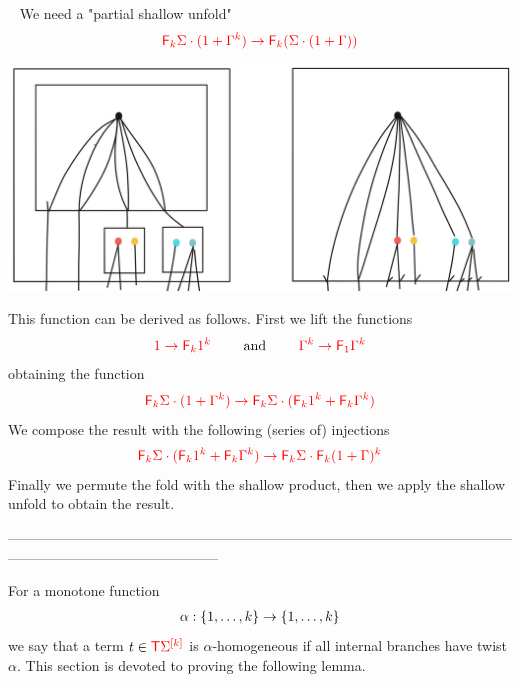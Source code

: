 \begin{example}~\label{ex:PartialShallowUnfold}
We need a "partial shallow unfold"
\begin{align*}
{\color{red}{{\color{red}{\mathsf F_{k}}}\Sigma\cdot (1+\Gamma^k)\to {\color{red}{\mathsf F_{k}}}(\Sigma\cdot(1+\Gamma))}}
\end{align*}
\begin{center}
\includegraphics[scale=.09]{MyPicPartialShallowUnfold.jpg}
\end{center}
This function can be derived as follows. First we lift the functions
\begin{align*}
{\color{red}{1\to {\color{red}{\mathsf F_{k}}}1^k}}\qquad \text{ and } \qquad{\color{red}{\Gamma^k\to {\color{red}{\mathsf F_{1}}}\Gamma^k}}
\end{align*}
obtaining the function
\begin{align*}
{\color{red}{{\color{red}{\mathsf F_{k}}}\Sigma\cdot (1+\Gamma^k)\to {\color{red}{\mathsf F_{k}}}\Sigma\cdot ({\color{red}{\mathsf F_{k}}}1^k+{\color{red}{\mathsf F_{k}}}\Gamma^k) }}
\end{align*}
We compose the result with the following  (series of) injections
\begin{align*}
{\color{red}{{\color{red}{\mathsf F_{k}}}\Sigma\cdot ({\color{red}{\mathsf F_{k}}}1^k+{\color{red}{\mathsf F_{k}}}\Gamma^k)\to {\color{red}{\mathsf F_{k}}}\Sigma\cdot {\color{red}{\mathsf F_{k}}}(1+\Gamma)^k}}
\end{align*}
Finally we permute the fold with the shallow product, then we apply the shallow unfold to obtain the result.
\end{example}
---------------------------------------------------------------------------------------------------------------------------------------------------------
\bigskip

For a monotone function 
\begin{align*}
\alpha: \{1,\ldots,k\} \to \{1,\ldots,k\}
\end{align*}
we say that a term $ t \in {\color{red}{\mathsf T}} {\color{red}{\Sigma}}^{{\color{red}{[k]}}}$ is $\alpha$-homogeneous if all internal branches have twist $\alpha$. This section is devoted to proving the following lemma. 

